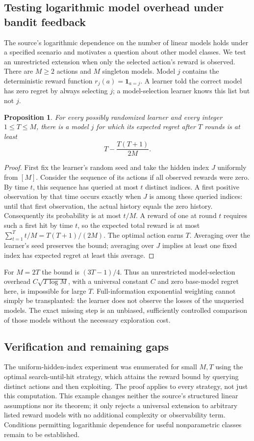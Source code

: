 \documentclass[11pt]{article}
\newtheorem{proposition}{Proposition}
\begin{document}
\subsection{Testing logarithmic model overhead under bandit feedback}
The source's logarithmic dependence on the number of linear models holds under a specified scenario and motivates a question about other model classes. We test an unrestricted extension when only the selected action's reward is observed. There are $M\ge2$ actions and $M$ singleton models. Model $j$ contains the deterministic reward function $r_j(a)=\mathbf1_{a=j}$. A learner told the correct model has zero regret by always selecting $j$; a model-selection learner knows this list but not $j$.
\begin{proposition}
For every possibly randomized learner and every integer $1\le T\le M$, there is a model $j$ for which its expected regret after $T$ rounds is at least
\[
T-\frac{T(T+1)}{2M}.
\]
\end{proposition}
\begin{proof}
First fix the learner's random seed and take the hidden index $J$ uniformly from $[M]$. Consider the sequence of its actions if all observed rewards were zero. By time $t$, this sequence has queried at most $t$ distinct indices. A first positive observation by that time occurs exactly when $J$ is among these queried indices: until that first observation, the actual history equals the zero history. Consequently its probability is at most $t/M$. A reward of one at round $t$ requires such a first hit by time $t$, so the expected total reward is at most $\sum_{t=1}^Tt/M=T(T+1)/(2M)$. The optimal action earns $T$. Averaging over the learner's seed preserves the bound; averaging over $J$ implies at least one fixed index has expected regret at least this average.
\end{proof}
For $M=2T$ the bound is $(3T-1)/4$. Thus an unrestricted model-selection overhead $C\sqrt{T\log M}$, with a universal constant $C$ and zero base-model regret here, is impossible for large $T$. Full-information exponential weighting cannot simply be transplanted: the learner does not observe the losses of the unqueried models. The exact missing step is an unbiased, sufficiently controlled comparison of those models without the necessary exploration cost.
\subsection{Verification and remaining gaps}
The uniform-hidden-index experiment was enumerated for small $M,T$ using the optimal search-until-hit strategy, which attains the reward bound by querying distinct actions and then exploiting. The proof applies to every strategy, not just this computation. This example changes neither the source's structured linear assumptions nor its theorem; it only rejects a universal extension to arbitrary listed reward models with no additional complexity or observability term. Conditions permitting logarithmic dependence for useful nonparametric classes remain to be established.
\end{document}
